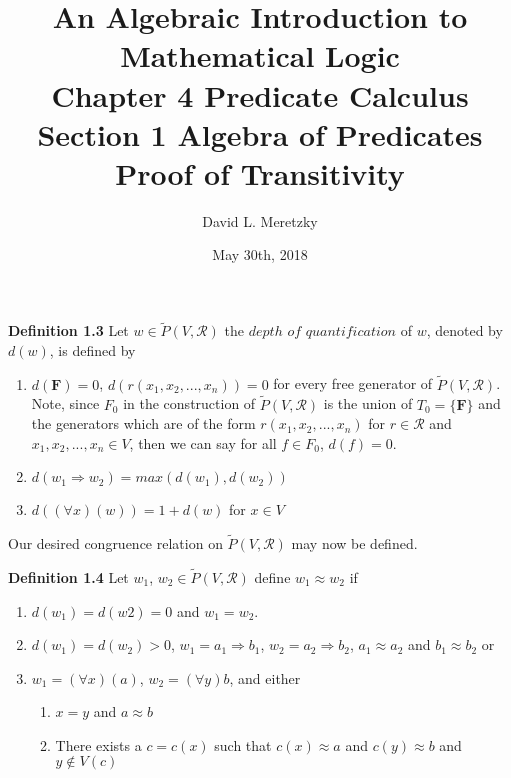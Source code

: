 \documentclass{article}
\title{ \vspace{-10ex} %
An Algebraic Introduction to Mathematical Logic\\
Chapter 4 Predicate Calculus \\
Section 1 Algebra of Predicates \\
Proof of Transitivity 
}
\author{David L. Meretzky
}
\date{%
May 30th, 2018
}
\theoremstyle{problemstyle}
\theoremstyle{lemmastyle}
\theoremstyle{theoremstyle}
\begin{document}
\maketitle

\begin{flushleft}
\textbf{Definition 1.3} Let $w \in \widetilde{P}(V,\mathscr{R})$ the $depth$ $of$ $quantification$ of $w$, denoted by $d(w)$, is defined by 

\begin{enumerate}
\item $d(\textbf{F}) = 0$, $d(r(x_1,x_2,...,x_n)) = 0$ for every free generator of $\widetilde{P}(V,\mathscr{R})$. Note, since $F_0$ in the construction of $\widetilde{P}(V,\mathscr{R})$ is the union of $T_0 = \{\textbf{F}\}$ and the generators which are of the form $r(x_1,x_2,...,x_n)$ for $r \in \mathscr{R}$ and $x_1,x_2,...,x_n \in V$, then we can say for all $f \in F_0$, $d(f) = 0$. 

\item $d(w_1 \Rightarrow w_2) = max(d(w_1),d(w_2))$

\item $d((\forall x)(w)) = 1 + d(w)$ for $x \in V$ 
\end{enumerate}
\end{flushleft}
Our desired congruence relation on $\widetilde{P}(V,\mathscr{R})$ may now be defined.

\begin{flushleft}
\textbf{Definition 1.4} Let $w_1$, $w_2 \in \widetilde{P}(V,\mathscr{R})$ define $w_1 \approx w_2$ if

\begin{enumerate}
\item $d(w_1) = d(w2) = 0$ and $w_1 = w_2$. 
\item $d(w_1) = d(w_2) > 0$, $w_1 = a_1 \Rightarrow b_1$, $w_2 = a_2 \Rightarrow b_2$, $a_1 \approx a_2$ and $b_1 \approx b_2$ or 
\item $w_1 = (\forall x)(a)$, $w_2 = (\forall y)b$, and either
\begin{enumerate}
\item $x = y$ and $a \approx b$   
\item There exists a $c = c(x)$ such that $c(x) \approx a$ and $c(y) \approx b$ and $y \notin V(c)$ 
\end{enumerate}
\end{enumerate}
\end{flushleft}
\end{document}
